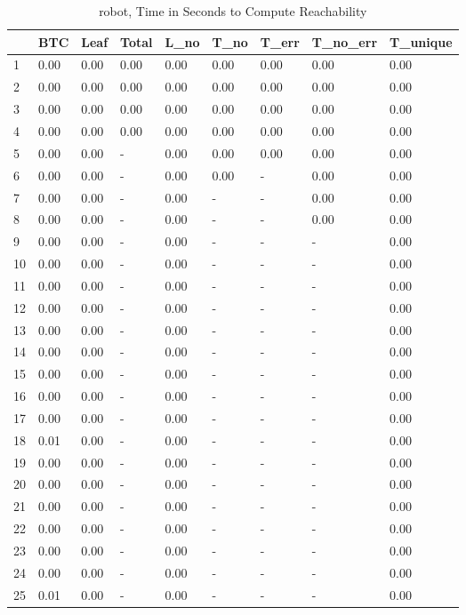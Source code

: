 \begin{table}
\centering
\caption{robot, Time in Seconds to Compute Reachability}
\label{robot_states_time}
\begin{tabular}{lllllllll}
\toprule
{} &   BTC &  Leaf & Total &  L\_no &  T\_no & T\_err & T\_no\_err & T\_unique \\
\midrule
1  &  0.00 &  0.00 &  0.00 &  0.00 &  0.00 &  0.00 &     0.00 &     0.00 \\
2  &  0.00 &  0.00 &  0.00 &  0.00 &  0.00 &  0.00 &     0.00 &     0.00 \\
3  &  0.00 &  0.00 &  0.00 &  0.00 &  0.00 &  0.00 &     0.00 &     0.00 \\
4  &  0.00 &  0.00 &  0.00 &  0.00 &  0.00 &  0.00 &     0.00 &     0.00 \\
5  &  0.00 &  0.00 &     - &  0.00 &  0.00 &  0.00 &     0.00 &     0.00 \\
6  &  0.00 &  0.00 &     - &  0.00 &  0.00 &     - &     0.00 &     0.00 \\
7  &  0.00 &  0.00 &     - &  0.00 &     - &     - &     0.00 &     0.00 \\
8  &  0.00 &  0.00 &     - &  0.00 &     - &     - &     0.00 &     0.00 \\
9  &  0.00 &  0.00 &     - &  0.00 &     - &     - &        - &     0.00 \\
10 &  0.00 &  0.00 &     - &  0.00 &     - &     - &        - &     0.00 \\
11 &  0.00 &  0.00 &     - &  0.00 &     - &     - &        - &     0.00 \\
12 &  0.00 &  0.00 &     - &  0.00 &     - &     - &        - &     0.00 \\
13 &  0.00 &  0.00 &     - &  0.00 &     - &     - &        - &     0.00 \\
14 &  0.00 &  0.00 &     - &  0.00 &     - &     - &        - &     0.00 \\
15 &  0.00 &  0.00 &     - &  0.00 &     - &     - &        - &     0.00 \\
16 &  0.00 &  0.00 &     - &  0.00 &     - &     - &        - &     0.00 \\
17 &  0.00 &  0.00 &     - &  0.00 &     - &     - &        - &     0.00 \\
18 &  0.01 &  0.00 &     - &  0.00 &     - &     - &        - &     0.00 \\
19 &  0.00 &  0.00 &     - &  0.00 &     - &     - &        - &     0.00 \\
20 &  0.00 &  0.00 &     - &  0.00 &     - &     - &        - &     0.00 \\
21 &  0.00 &  0.00 &     - &  0.00 &     - &     - &        - &     0.00 \\
22 &  0.00 &  0.00 &     - &  0.00 &     - &     - &        - &     0.00 \\
23 &  0.00 &  0.00 &     - &  0.00 &     - &     - &        - &     0.00 \\
24 &  0.00 &  0.00 &     - &  0.00 &     - &     - &        - &     0.00 \\
25 &  0.01 &  0.00 &     - &  0.00 &     - &     - &        - &     0.00 \\
\bottomrule
\end{tabular}
\end{table}
